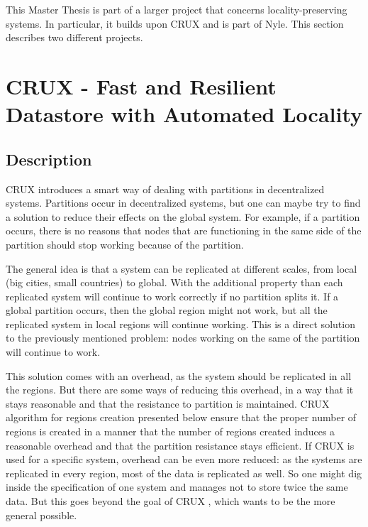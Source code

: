 \documentclass[a4paper,11pt,oneside]{report}
\begin{document}

This Master Thesis is part of a larger project that concerns
locality-preserving systems. In particular, it builds upon
CRUX \cite{Basescu2014} and is part of Nyle. This section describes two
different projects. 

\section{CRUX - Fast and Resilient Datastore with Automated Locality}

\subsection{Description}
CRUX \cite{Basescu2014} introduces a smart way of dealing with partitions in
decentralized systems. Partitions occur in decentralized systems, but one can
maybe try to find a solution to reduce their effects on the global system. For
example, if a partition occurs, there is no reasons that nodes that are
functioning in the same side of the partition should stop working because of
the partition. 

The general idea is that a system can be replicated at different scales, from
local (big cities, small countries) to global. With the additional property
than each replicated system will continue to work correctly if no partition
splits it. If a global partition occurs, then the global region might not work,
but all the replicated system in local regions will continue working. This is a
direct solution to the previously mentioned problem: nodes working on the same
of the partition will continue to work.

This solution comes with an overhead, as the system should be replicated in all
the regions. But there are some ways of reducing this overhead, in a way that
it stays reasonable and that the resistance to partition is maintained. CRUX
algorithm for regions creation \cite{Basescu2014} presented below ensure that
the proper number of regions is created in a manner that the number of regions
created induces a reasonable overhead and that the partition resistance stays
efficient. If CRUX \cite{Basescu2014} is used for a specific system, overhead
can be even more reduced: as the systems are replicated in every region, most
of the data is replicated as well. So one might dig inside the specification of
one system and manages not to store twice the same data. But this goes beyond
the goal of CRUX \cite{Basescu2014}, which wants to be the more general
possible. 
\end{document}
